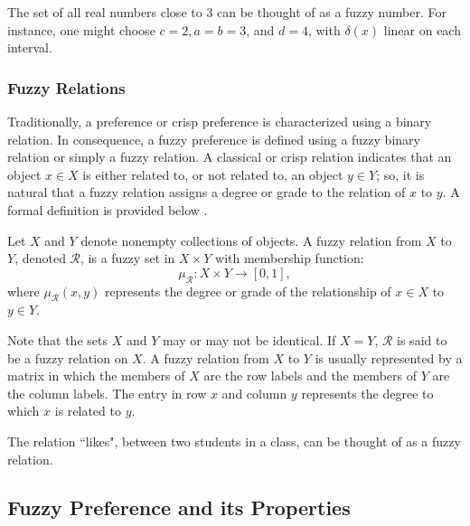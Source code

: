 \begin{example}
\rm The set of all real numbers close to $3$ can be thought of as a fuzzy number. For instance, one might choose $c = 2, a = b = 3$, and $d = 4$, with $\delta(x)$ linear on each interval.
\end{example}

\subsubsection{Fuzzy Relations}

Traditionally, a preference or crisp preference is characterized using a binary relation. In consequence, a fuzzy preference is defined using a fuzzy binary relation or simply a fuzzy relation. A classical or crisp relation indicates that an object $x \in X$ is either related to, or not related to, an object $y \in Y$; so, it is natural that a fuzzy relation assigns a degree or grade to the relation of $x$ to $y$. A formal definition is provided below \citep{Klir&Yuan95}.

\begin{definition}
\rm Let $X$ and $Y$ denote nonempty collections of objects. A fuzzy relation from $X$ to $Y$, denoted $\mathcal{R}$, is a fuzzy set in $X \times Y$ with membership function:
$$\mu_{\mathcal{R}} : X \times Y \longrightarrow [0, 1],$$
where $\mu_{\mathcal{R}}(x, y)$ represents the degree or grade of the relationship of $x \in X$ to $y \in Y$.
\end{definition}

Note that the sets $X$ and $Y$ may or may not be identical. If $X = Y$, $\mathcal{R}$ is said to be a fuzzy relation on $X$. A fuzzy relation from $X$ to $Y$ is usually represented by a matrix in which the members of $X$ are the row labels and the members of $Y$ are the column labels. The entry in row $x$ and column $y$ represents the degree to which $x$ is related to $y$.

\begin{example}
\rm The relation ``likes", between two students in a class, can be thought of as a fuzzy relation.
\end{example}


\subsection{Fuzzy Preference and its Properties}

